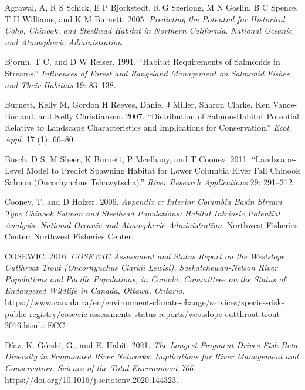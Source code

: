 \documentclass[
  letterpaper,
  DIV=11,
  numbers=noendperiod]{scrreprt}
\newlength{\cslhangindent}
\newenvironment{CSLReferences}[2] %
 {\begin{list}{}{%
  \setlength{\itemindent}{0pt}
  \setlength{\leftmargin}{0pt}
  \setlength{\parsep}{0pt}
  \ifodd #1
   \setlength{\leftmargin}{\cslhangindent}
   \setlength{\itemindent}{-1\cslhangindent}
  \fi
  \setlength{\itemsep}{#2\baselineskip}}}
 {\end{list}}
\begin{document}
\label{refs}
\begin{CSLReferences}{1}{0}
Agrawal, A, R S Schick, E P Bjorkstedt, R G Szerlong, M N Goslin, B C
Spence, T H Williams, and K M Burnett. 2005. \emph{Predicting the
Potential for Historical Coho, Chinook, and Steelhead Habitat in
Northern California}. \emph{National Oceanic and Atmospheric
Administration}.

Bjornn, T C, and D W Reiser. 1991. {``Habitat Requirements of Salmonids
in Streams.''} \emph{Influences of Forest and Rangeland Management on
Salmonid Fishes and Their Habitats} 19: 83--138.

Burnett, Kelly M, Gordon H Reeves, Daniel J Miller, Sharon Clarke, Ken
Vance-Borland, and Kelly Christiansen. 2007. {``Distribution of
Salmon-Habitat Potential Relative to Landscape Characteristics and
Implications for Conservation.''} \emph{Ecol. Appl.} 17 (1): 66--80.

Busch, D S, M Sheer, K Burnett, P Mcelhany, and T Cooney. 2011.
{``Landscape-Level Model to Predict Spawning Habitat for Lower Columbia
River Fall Chinook Salmon (Oncorhynchus Tshawytscha).''} \emph{River
Research Applications} 29: 291--312.

Cooney, T, and D Holzer. 2006. \emph{Appendix c: Interior Columbia Basin
Stream Type Chinook Salmon and Steelhead Populations: Habitat Intrinsic
Potential Analysis. National Oceanic and Atmospheric Administration}.
Northwest Fisheries Center: Northwest Fisheries Center.

COSEWIC. 2016. \emph{COSEWIC Assessment and Status Report on the
Westslope Cutthroat Trout (Oncorhynchus Clarkii Lewisi),
Saskatchewan-Nelson River Populations and Pacific Populations, in
Canada. Committeee on the Status of Endangered Wildlife in Canada,
Ottawa, Ontario.}
https://www.canada.ca/en/environment-climate-change/services/species-risk-public-registry/cosewic-assessments-status-reports/westslope-cutthroat-trout-2016.html.:
ECC.

Díaz, K. Górski, G., and E. Habit. 2021. \emph{The Longest Fragment
Drives Fish Beta Diversity in Fragmented River Networks: Implications
for River Management and Conservation. Science of the Total Environment
766.} https://doi.org/10.1016/j.scitotenv.2020.144323.


\end{CSLReferences}
\end{document}
